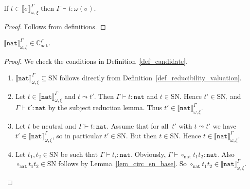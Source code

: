 \documentclass[runningheads,a4paper]{llncs}
\newcommand{\nat}{\mathtt{nat}}
\newcommand{\SN}{\mathrm{SN}}
\newcommand{\Cb}{\mathbb{C}}
\newcommand{\val}[3]{\ensuremath{\llbracket#1\rrbracket_{#2}^{#3}}}
\newcommand{\proves}{\vdash}
\begin{document}
\begin{lemma}\label{lem_val_typable}
  If $t \in \val{\sigma}{\omega,\xi}{\Gamma}$ then
  $\Gamma \proves t : \omega(\sigma)$.
\end{lemma}

\begin{proof}
  Follows from definitions.
\end{proof}

\begin{lemma}\label{lem_nat_reducible}
  $\val{\nat}{\omega,\xi}{\Gamma} \in \Cb_{\nat}^\Gamma$.
\end{lemma}

\begin{proof}
  We check the conditions in Definition~\ref{def_candidate}.
  \begin{enumerate}
  \item $\val{\nat}{\omega,\xi}{\Gamma} \subseteq \SN$ follows
    directly from Definition~\ref{def_reducibility_valuation}.
  \item Let $t \in \val{\nat}{\omega,\xi}{\Gamma}$ and
    $t \leadsto t'$. Then $\Gamma \proves t : \nat$ and $t \in
    \SN$. Hence $t' \in \SN$, and $\Gamma \proves t' : \nat$ by the
    subject reduction lemma. Thus
    $t' \in \val{\nat}{\omega,\xi}{\Gamma}$.
  \item Let $t$ be neutral and $\Gamma \proves t : \nat$. Assume that
    for all~$t'$ with $t \leadsto t'$ we have
    $t' \in \val{\nat}{\omega,\xi}{\Gamma}$, so in particular
    $t' \in \SN$. But then $t \in \SN$. Hence
    $t \in \val{\nat}{\omega,\xi}{\Gamma}$.
  \item Let $t_1,t_2 \in \SN$ be such that
    $\Gamma \proves t_i : \nat$. Obviously,
    $\Gamma \proves \circ_\nat t_1 t_2 : \nat$. Also
    $\circ_\nat t_1 t_2 \in \SN$ follows by Lemma~\ref{lem_circ_sn_base}.
    So $\circ_\nat t_1 t_2 \in \val{\nat}{\omega,\xi}{\Gamma}$.
  \end{enumerate}
\end{proof}
\end{document}
